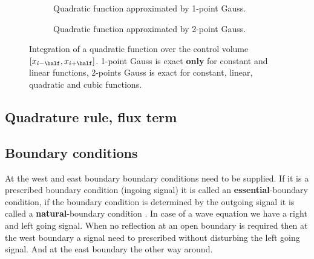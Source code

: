 \begin{figure}[H]
    \begin{subfigure}{0.475\textwidth}
       \begin{center}
        \def\svgwidth{1.2\textwidth} %
    \end{center}
    \caption{Quadratic function approximated by 1-point Gauss.} \label{fig:1d_integration_1points_gauss}
    \end{subfigure}
\hfill
    \begin{subfigure}{0.475\textwidth}
    \begin{center}
        \def\svgwidth{1.2\textwidth} %
    \end{center}
    \caption{Quadratic function approximated by 2-point Gauss.} \label{fig:1d_integration_2points_gauss}
    \end{subfigure}
    \caption[Illustration of the 1-point and 2-point Gauss integration method of a quadratic function.]{Integration of a quadratic function over the control volume  $[x_{i-\half}, x_{i+\half}]$. 1-point Gauss is exact \textbf{only} for constant and linear functions, 2-points Gauss is exact for constant, linear, quadratic and cubic functions.} \label{fig:1d_integration}
\end{figure}

\subsection{Quadrature rule, flux term}\label{sec:flux_quadrature_rule}
\notyet
\subsection{Boundary conditions}\label{sec:boundary_conditions}
At the west and east boundary boundary conditions need to be supplied.
If it is a prescribed boundary condition (ingoing signal) it is called an \textbf{essential}-boundary condition, if the boundary condition is determined by the outgoing signal it is called a \textbf{natural}-boundary condition \citep{Logan1987,VanKanEtAL2008}.
In case of a wave equation we have a right and left going signal.
When no reflection at an open boundary is required then at the west boundary a signal need to prescribed  without disturbing the left going signal.
And at the east boundary the other way around.


